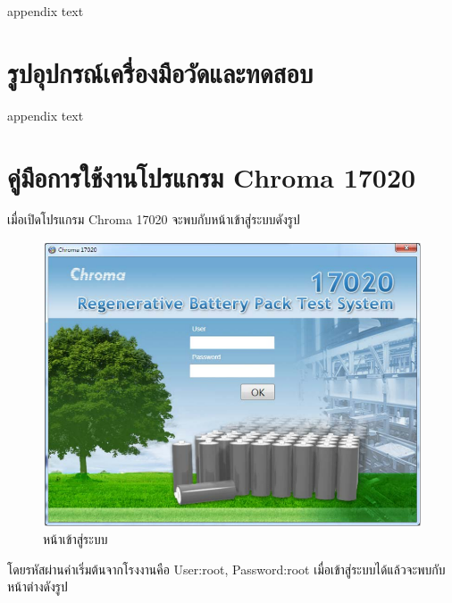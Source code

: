 \appendix[nosub] %

appendix text
\chapter{รูปอุปกรณ์เครื่องมือวัดและทดสอบ}
 appendix text
\chapter{คู่มือการใช้งานโปรแกรม Chroma 17020}
 เมื่อเปิดโปรแกรม Chroma 17020 จะพบกับหน้าเข้าสู่ระบบดังรูป
 \begin{center}
	\begin{figure}[H]
		\includegraphics[width=1\linewidth]{Chapters/img/17020_Program/Loggin.png}
		\centering
		\captionsetup{justification=centering,margin=2cm}
		\caption{หน้าเข้าสู่ระบบ}
	\end{figure}
\end{center}
โดยรหัสผ่านค่าเริ่มต้นจากโรงงานคือ User:root, Password:root เมื่อเข้าสู่ระบบได้แล้วจะพบกับหน้าต่างดังรูป
